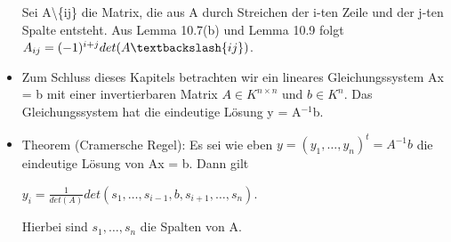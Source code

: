 \begin{itemize}
Sei A\textbackslash\{ij\} die Matrix, die aus A durch Streichen der i-ten Zeile und der j-ten Spalte entsteht. Aus Lemma 10.7(b) und Lemma 10.9 folgt $A_{ij} =(-1)^{i+j} det(A\textbackslash\{ij\})$.
\item Zum Schluss dieses Kapitels betrachten wir ein lineares Gleichungssystem Ax = b mit einer invertierbaren Matrix $A \in K^{n \times n}$ und $b \in K^n$. Das Gleichungssystem hat die eindeutige Lösung y = A$^{-1}$b.
\item Theorem (Cramersche Regel): Es sei wie eben $y = (y_1, …, y_n)^t = A^{-1}b$ die eindeutige Lösung von Ax = b. Dann gilt
\begin{center}
$y_i = \frac{1}{det(A)} det(s_1, …, s_{i-1}, b, s_{i+1}, …, s_n)$.
\end{center}
Hierbei sind $s_1, …, s_n$ die Spalten von A.\\
\end{itemize}

